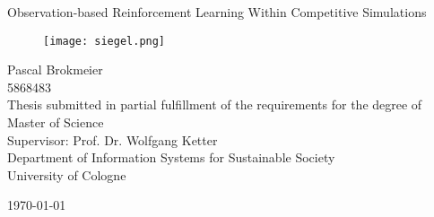 \begin{titlepage}
\setlength{\parindent}{0pt} %
\begin{center}

\Huge{Observation-based Reinforcement Learning Within Competitive Simulations}

\vspace{10mm}
\begin{figure}[!h]
    \centering
    \texttt{[image: siegel.png]}
\end{figure}

\vspace{10mm}

\small{
Pascal Brokmeier \\ 5868483 \\
}
\vspace{10mm}
\small{Thesis submitted in partial fulfillment of the requirements for the degree of Master of Science\\}
\vspace{10mm}
\small{Supervisor: Prof. Dr. Wolfgang Ketter \\
Department of Information Systems for Sustainable Society \\
University of Cologne\\}

\vspace{10mm}
\today
{}
\end{center}
\end{titlepage}
